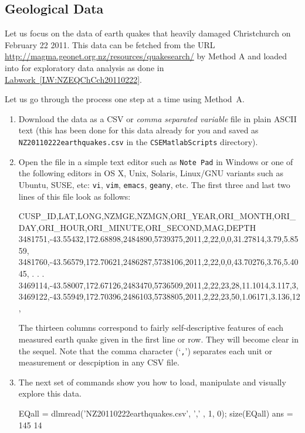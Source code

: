 \subsection{Geological Data}
 Let us focus on the data of earth quakes that heavily damaged Christchurch on February 22 2011.  This data can be fetched from the URL \href{http://magma.geonet.org.nz/resources/quakesearch/}{\url{http://magma.geonet.org.nz/resources/quakesearch/}} by {\sf Method A} and loaded into \Matlab for exploratory data analysis as done in \hyperref[LW:NZEQChCch20110222]{Labwork~\ref*{LW:NZEQChCch20110222}}.
 
 \begin{labwork}\label{LW:NZEQChCch20110222}
Let us go through the process one step at a time using {\sf Method~A}.  
\begin{enumerate}
\item Download the data as a CSV or {\em comma separated variable} file in plain ASCII text (this has been done for this data already for you and saved as {\tt NZ20110222earthquakes.csv} in the {\tt CSEMatlabScripts} directory).
\item Open the file in a simple text editor such as {\tt Note Pad} in Windows or one of the following editors in OS X, Unix, Solaris, Linux/GNU variants such as Ubuntu, SUSE, etc: {\tt vi}, {\tt vim}, {\tt emacs}, {\tt geany}, etc.  The first three and last two lines of this file look as follows:
\begin{VrbM} 
CUSP_ID,LAT,LONG,NZMGE,NZMGN,ORI_YEAR,ORI_MONTH,ORI_DAY,ORI_HOUR,ORI_MINUTE,ORI_SECOND,MAG,DEPTH
3481751,-43.55432,172.68898,2484890,5739375,2011,2,22,0,0,31.27814,3.79,5.8559,
3481760,-43.56579,172.70621,2486287,5738106,2011,2,22,0,0,43.70276,3.76,5.4045,
.
.
.
3469114,-43.58007,172.67126,2483470,5736509,2011,2,22,23,28,11.1014,3.117,3,
3469122,-43.55949,172.70396,2486103,5738805,2011,2,22,23,50,1.06171,3.136,12,
\end{VrbM}
The thirteen columns correspond to fairly self-descriptive features of each measured earth quake given in the first line or row.  They will become clear in the sequel.  Note that the comma character (`{\tt ,}') separates each unit or measurement or descpiption in any CSV file.

\item The next set of commands show you how to load,  manipulate and visually explore this data.

\begin{VrbM}
%
EQall = dlmread('NZ20110222earthquakes.csv', ',' , 1, 0); 
size(EQall) %
ans =
   145    14
\end{VrbM}


\end{enumerate}
\end{labwork}
